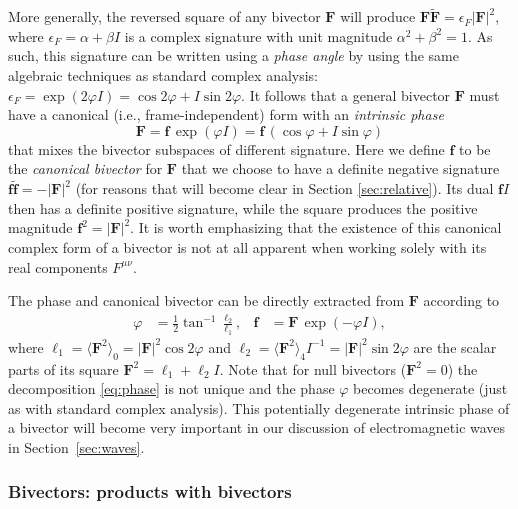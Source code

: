 \documentclass[1p,sort&compress]{elsarticle}
\numberwithin{equation}{section}
\newcommand{\bv}[1]{\mathbf{#1}}
\newcommand{\mean}[1]{\langle #1 \rangle}
\begin{document}
More generally, the reversed square of any bivector $\bv{F}$ will produce $\bv{F}\widetilde{\bv{F}} = \epsilon_F |\bv{F}|^2$, where $\epsilon_{F} = \alpha + \beta I$ is a complex signature with unit magnitude $\alpha^2 + \beta^2 = 1$.  As such, this signature can be written using a \emph{phase angle} by using the same algebraic techniques as standard complex analysis: $\epsilon_F = \exp(2\varphi I) = \cos2\varphi + I\sin2\varphi$.  It follows that a general bivector $\bv{F}$ must have a canonical (i.e., frame-independent) form with an \emph{intrinsic phase} 
\begin{equation}\label{eq:phase}
  \bv{F} = \bv{f}\, \exp(\varphi I) = \bv{f}\, (\cos\varphi +  I \sin\varphi)
\end{equation}
that mixes the bivector subspaces of different signature.  Here we define $\bv{f}$ to be the \emph{canonical bivector} for $\bv{F}$ that we choose to have a definite negative signature $\bv{f}\widetilde{\bv{f}} = -|\bv{F}|^2$ (for reasons that will become clear in Section \ref{sec:relative}).  Its dual $\bv{f}I$ then has a definite positive signature, while the square produces the positive magnitude $\bv{f}^2 = |\bv{F}|^2$.  It is worth emphasizing that the existence of this canonical complex form of a bivector is not at all apparent when working solely with its real components $F^{\mu\nu}$.

The phase and canonical bivector can be directly extracted from $\bv{F}$ according to
\begin{align}\label{eq:phasecomp}
  \varphi &= \frac{1}{2}\tan^{-1}\frac{\ell_2}{\ell_1}, &
  \bv{f} &= \bv{F}\, \exp(-\varphi I),
\end{align}
where $\ell_1 = \mean{\bv{F}^2}_0 = |\bv{F}|^2\cos2\varphi$ and $\ell_2 = \mean{\bv{F}^2}_4 I^{-1} = |\bv{F}|^2\sin2\varphi$ are the scalar parts of its square $\bv{F}^2 = \ell_1 + \ell_2 I$.  Note that for null bivectors ($\bv{F}^2 = 0$) the decomposition \eqref{eq:phase} is not unique and the phase $\varphi$ becomes degenerate (just as with standard complex analysis).  This potentially degenerate intrinsic phase of a bivector will become very important in our discussion of electromagnetic waves in Section~\ref{sec:waves}.


\subsubsection{Bivectors: products with bivectors}\label{sec:bivectorbivector}
\end{document}
